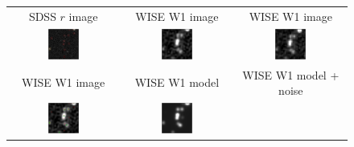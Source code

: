 \documentclass[12pt,preprint]{aastex}
\begin{document}
\begin{figure}
\begin{center}
\begin{tabular}{ccc}
  SDSS $r$ image &
  WISE W1 image &
  WISE W1 image \\
  \includegraphics[width=0.3\textwidth]{model-30} &
  \includegraphics[width=0.3\textwidth]{model-31} &
  \includegraphics[width=0.3\textwidth]{model-35} \\
  WISE W1 image &
  WISE W1 model &
  WISE W1 model + noise \\
  \includegraphics[width=0.3\textwidth]{model-32} &
  \includegraphics[width=0.3\textwidth]{model-33} &

\end{tabular}
\end{center}
\end{figure}
\end{document}
